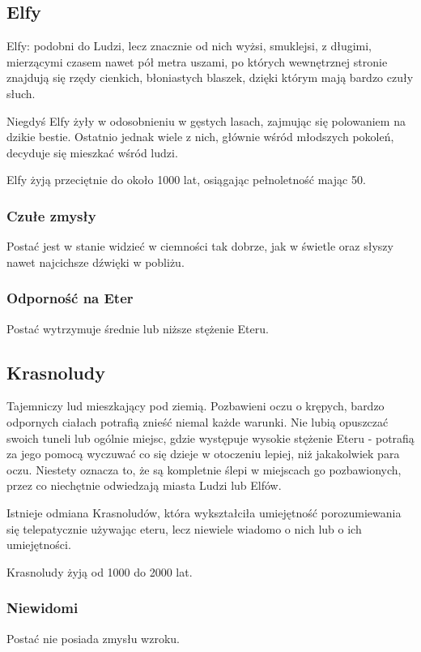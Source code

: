 \documentclass[10pt,a4paper]{book}
\begin{document}
\begin{multicols}{2}
\subsection*{Elfy}
Elfy: podobni do Ludzi, lecz znacznie od nich wyżsi, smuklejsi, z długimi, mierzącymi czasem nawet pół metra uszami, po których wewnętrznej stronie znajdują się rzędy cienkich, błoniastych blaszek, dzięki którym mają bardzo czuły słuch.

Niegdyś Elfy żyły w odosobnieniu w gęstych lasach, zajmując się polowaniem na dzikie bestie. Ostatnio jednak wiele z nich, głównie wśród młodszych pokoleń, decyduje się mieszkać wśród ludzi.

Elfy żyją przeciętnie do około 1000 lat, osiągając pełnoletność mając 50.

\subsubsection*{Czułe zmysły}
Postać jest w stanie widzieć w ciemności tak dobrze, jak w świetle oraz słyszy nawet najcichsze dźwięki w pobliżu.

\subsubsection*{Odporność na Eter}
Postać wytrzymuje średnie lub niższe stężenie Eteru.



\subsection*{Krasnoludy}
Tajemniczy lud mieszkający pod ziemią. Pozbawieni oczu o krępych, bardzo odpornych ciałach potrafią znieść niemal każde warunki. Nie lubią opuszczać swoich tuneli lub ogólnie miejsc, gdzie występuje wysokie stężenie Eteru - potrafią za jego pomocą wyczuwać co się dzieje w otoczeniu lepiej, niż jakakolwiek para oczu. Niestety oznacza to, że są kompletnie ślepi w miejscach go pozbawionych, przez co niechętnie odwiedzają miasta Ludzi lub Elfów.

Istnieje odmiana Krasnoludów, która wykształciła umiejętność porozumiewania się telepatycznie używając eteru, lecz niewiele wiadomo o nich lub o ich umiejętności.

Krasnoludy żyją od 1000 do 2000 lat.

\subsubsection*{Niewidomi}
Postać nie posiada zmysłu wzroku.


\end{multicols}
\end{document}
